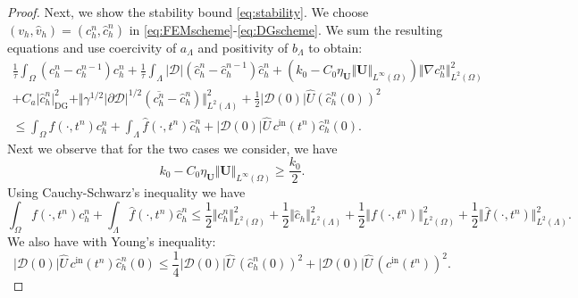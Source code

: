 \documentclass[pdflatex,sn-mathphys-num]{sn-jnl}%
\newcommand{\bfU}{{\boldsymbol U}}
\newcommand{\DG}{\mathrm{DG}}
\theoremstyle{thmstyleone}%
\theoremstyle{thmstyletwo}%
\theoremstyle{thmstylethree}%
\begin{document}
\begin{proof}
Next, we show the stability bound \eqref{eq:stability}. We choose $(v_h,\hat v_h) = (c_h^n, \hat c_h^n)$ in \eqref{eq:FEMscheme}-\eqref{eq:DGscheme}. We sum the resulting equations and use coercivity of $a_\Lambda$ and positivity of $b_\Lambda$ to obtain:
\begin{align}
    \frac{1}{\tau}\int_\Omega (c_h^{n}-c_h^{n-1}) c_h^n
      + \frac{1}{\tau} \int_\Lambda |\mathcal{D}|(\hat c_h^{n}- \hat c_h^{n-1}) \hat c_h^n 
      +  (k_0 - C_0\eta_\bfU \Vert \bfU\Vert_{L^\infty(\Omega)}) \Vert \nabla c_h^n \Vert_{L^2(\Omega)}^2
      \nonumber\\
      + C_a \vert \hat c_h^n \vert_{\DG}^2 
      +\Vert \gamma^{1/2} \vert \partial\mathcal{D}\vert^{1/2} \left(\overline{c_h^{n}}-\hat{c}_h^{n}\right)\Vert_{L^2(\Lambda)}^2
%
+ \frac12 \vert \mathcal{D}(0)\vert \hat U (\hat c_h^n(0))^2
%   
\nonumber\\
        \leq  \int_\Omega f(\cdot,t^{n}) c_h^n
   + \int_\Lambda \hat f(\cdot, t^{n}) \hat c_h^n
   + |\mathcal{D}(0)|\hat U \, c^{\mathrm{in}}(t^n) \hat c_h^n(0).\label{eq:apriori1}
\end{align}
Next we observe that for the two cases we consider, we have
\begin{equation}\label{eq:twocases}
k_0 - C_0\eta_\bfU \Vert \bfU\Vert_{L^\infty(\Omega)} \geq \frac{k_0}{2}.
\end{equation}
Using Cauchy-Schwarz's inequality we have
\[
\int_\Omega f(\cdot,t^{n}) c_h^n
   + \int_\Lambda \hat f(\cdot, t^{n}) \hat c_h^n
   \leq \frac12 \Vert c_h^n\Vert_{L^2(\Omega)}^2
   + \frac12 \Vert \hat c_h \Vert_{L^2(\Lambda)}^2
   +\frac12 \Vert f(\cdot,t^n)\Vert_{L^2(\Omega)}^2
   + \frac12 \Vert \hat f(\cdot,t^n) \Vert_{L^2(\Lambda)}^2.
\]
We also have with Young's inequality:
\[
|\mathcal{D}(0)|\hat U \, c^{\mathrm{in}}(t^n)  \hat c_h^n(0)
\leq\frac14 |\mathcal{D}(0)|\hat U \,  (\hat c_h^n(0))^2
+ |\mathcal{D}(0)|\hat U \, (c^{\mathrm{in}}(t^n))^2.
\]


\end{proof}
\end{document}
